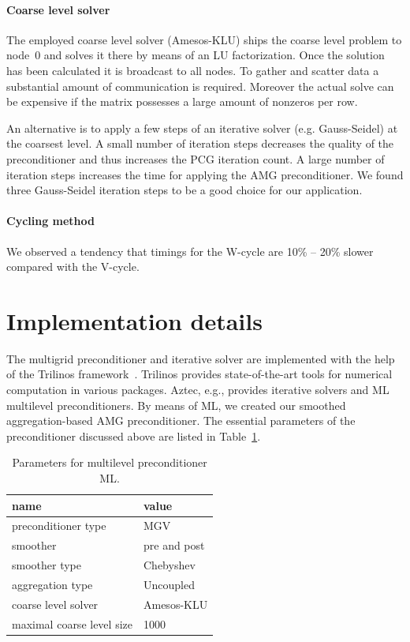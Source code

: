 \documentclass[a4paper,10pt,3p,final,pdftex]{elsarticle}
\begin{document}
\paragraph{Coarse level solver} The employed coarse level solver
(Amesos-KLU) ships the coarse level problem to node~0 and solves it
there by means of an LU factorization.  Once the solution has been
calculated it is broadcast to all nodes.  To gather and scatter data a
substantial amount of communication is required.  Moreover the actual
solve can be expensive if the matrix possesses a large amount of
nonzeros per row.

An alternative is to apply a few steps of an iterative solver (e.g.
Gauss-Seidel) at the coarsest level.  A small number of iteration steps
decreases the quality of the preconditioner and thus increases the PCG
iteration count.  A large number of iteration steps increases the time
for applying the AMG preconditioner.  We found three Gauss-Seidel
iteration steps to be a good choice for our application.

\paragraph{Cycling method} We observed a tendency that timings for the
W-cycle are 10\% -- 20\% slower compared with the V-cycle.

\section{Implementation details}
\label{sec:impl}

The multigrid preconditioner and iterative solver are implemented with
the help of the Trilinos framework~\cite{Trilinos-Web-Site,
  Trilinos-TOMS}.  Trilinos provides state-of-the-art tools for
numerical computation in various packages.  Aztec, e.g., provides
iterative solvers and ML~\cite{gsht:06} multilevel preconditioners.  By
means of ML, we created our smoothed aggregation-based AMG
preconditioner.  The essential parameters of the preconditioner
discussed above are listed in Table~\ref{tab:sa_setup}.
\begin{table}[htb]
  \begin{center}
    \begin{tabular}{l|l}
      \hline
      name & value \\
      \hline
      preconditioner type & MGV \\
      smoother & pre and post \\
      smoother type & Chebyshev \\
      aggregation type & Uncoupled \\
      coarse level solver & Amesos-KLU \\
      maximal coarse level size & 1000 \\
      \hline
    \end{tabular}
    \caption{Parameters for multilevel preconditioner ML.}
    \label{tab:sa_setup}
  \end{center}
\end{table}
\end{document}
